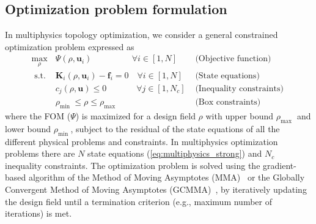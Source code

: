     \subsection*{Optimization problem formulation}
    In multiphysics topology optimization, we consider a general constrained optimization problem 
    expressed as
    \begin{equation}
        \begin{array}{clr}
            \max\limits_{\rho}                        & \Psi(\rho, \mathbf{u}_i) \quad \quad \quad \quad \,\,\,\, 
             \forall i \in\left[1, N\right] & \text { (Objective function) }                                                         \\
            \text { s.t. }                            & \mathbf{K}_i(\rho, \mathbf{u}_i)-\mathbf{f}_i=0 \quad
            \forall i \in\left[1, N\right]          & \text { (State equations) }                                                            \\
                                                      & c_j(\rho, \mathbf{u}) \leq 0 \quad \quad \quad \,\,\, \forall j \in\left[1,
            N_c\right]                                & \text { (Inequality constraints) }                                                     \\
                                                      & \rho_{\text {min }} \leq \rho \leq \rho_{\text {max }}                  & \text { (Box
                constraints) }
        \end{array}
    \end{equation}
    where the FOM ($\Psi$) is maximized for a design field $\rho$ with upper
    bound $\rho_{\text {max }}$ and lower bound $\rho_{\text {min }}$,
    subject to the residual of the state equations of all the different physical
    problems and constraints. In multiphysics optimization problems
    there are $N$ state equations (\eqref{eq:multiphysics_strong})
    and  $N_c$ inequality constraints. The optimization problem is solved using
    the gradient-based algorithm of the Method of Moving
    Asymptotes (MMA)~\cite{MMA} or the Globally Convergent Method of Moving Asymptotes
    (GCMMA)~\cite{GCMMA}, by iteratively updating the design field until a
    termination criterion (e.g., maximum number of iterations) is met.

